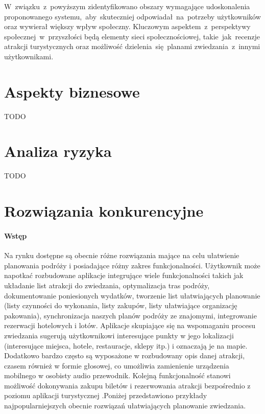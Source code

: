 \indent W~związku~z~powyższym zidentyfikowano obszary wymagające udoskonalenia proponowanego systemu,~aby~skuteczniej odpowiadał~na~potrzeby użytkowników oraz wywierał większy wpływ społeczny.
Kluczowym aspektem~z~perspektywy społecznej~w~przyszłości będą elementy sieci społecznościowej, takie~jak~recenzje atrakcji turystycznych oraz możliwość dzielenia~się~planami zwiedzania~z~innymi użytkownikami.

\section{Aspekty biznesowe}
\label{sec:aspekty-biznesowe}

TODO

\section{Analiza ryzyka}
\label{sec:analiza-ryzyka}

TODO

\section{Rozwiązania konkurencyjne}
\label{sec:rozwiazania-konkurencyjne}

\paragraph{Wstęp}

Na rynku dostępne są obecnie różne rozwiązania mające na celu ułatwienie planowania podróży i posiadające różny zakres funkcjonalności.
Użytkownik może napotkać rozbudowane aplikacje integrujące wiele funkcjonalności takich jak układanie list atrakcji do zwiedzania,
optymalizacja tras podróży, dokumentowanie poniesionych wydatków, tworzenie list ułatwiających planowanie (listy czynności do wykonania,
listy zakupów, listy ułatwiające organizację pakowania), synchronizacja naszych planów podróży ze znajomymi, integrowanie rezerwacji hotelowych i lotów.
Aplikacje skupiające się na wspomaganiu procesu zwiedzania sugerują użytkownikowi interesujące punkty w jego lokalizacji (interesujące miejsca, hotele,
restauracje, sklepy itp.) i oznaczają je na mapie. Dodatkowo bardzo często są wyposażone w rozbudowany opis danej atrakcji, czasem również w formie
głosowej, co umożliwia zamienienie urządzenia mobilnego w osobisty audio przewodnik. Kolejną funkcjonalność stanowi możliwość dokonywania zakupu biletów
i rezerwowania atrakcji bezpośrednio z poziomu aplikacji turystycznej .Poniżej przedstawiono przykłady najpopularniejszych obecnie rozwiązań
ułatwiających planowanie zwiedzania.

